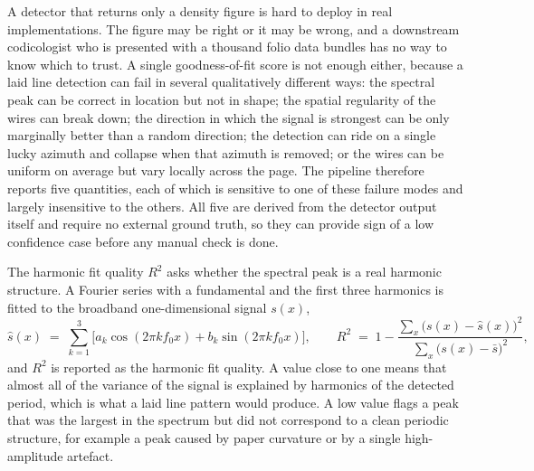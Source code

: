 A detector that returns only a density figure is hard to deploy in real implementations. The figure may be right or it may be wrong, and a downstream
codicologist who is presented with a thousand folio data bundles
has no way to know which to trust. A single goodness-of-fit score
is not enough either, because a laid line detection can fail in
several qualitatively different ways: the spectral peak can be
correct in location but not in shape; the spatial regularity of the
wires can break down; the direction in which the signal is strongest
can be only marginally better than a random direction; the
detection can ride on a single lucky azimuth and collapse when that
azimuth is removed; or the wires can be uniform on average but vary
locally across the page. The pipeline therefore reports five
quantities, each of which is sensitive to one of these failure
modes and largely insensitive to the others. All five are derived
from the detector output itself and require no external ground
truth, so they can provide sign of a low confidence case before any manual
check is done.

The harmonic fit quality $R^2$ asks whether the spectral peak is a
real harmonic structure. A Fourier series with a
fundamental and the first three harmonics is fitted to the
broadband one-dimensional signal $s(x)$,
\begin{equation}
  \hat{s}(x) \;=\; \sum_{k=1}^{3} \bigl[
    a_k \cos(2\pi k f_0 x) + b_k \sin(2\pi k f_0 x)
  \bigr],
  \qquad
  R^2 \;=\; 1 - \frac{\sum_x \bigl(s(x) - \hat{s}(x)\bigr)^2}
                      {\sum_x \bigl(s(x) - \bar{s}\bigr)^2},
  \label{eq:harmonic_r2}
\end{equation}
and $R^2$ is reported as the harmonic fit quality. A value close to
one means that almost all of the variance of the signal is explained
by harmonics of the detected period, which is what a 
laid line pattern would produce. A low value flags a peak that was the
largest in the spectrum but did not correspond to a clean periodic
structure, for example a peak caused by paper curvature or by a
single high-amplitude artefact.

